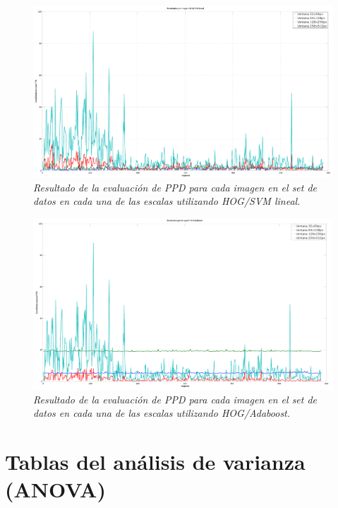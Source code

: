 \begin{figure}[htc]
  \centering
  \includegraphics[scale=.25]{images/fullresultssvm}
  \caption{\em  Resultado de la evaluación de PPD para cada imagen en el set de datos en cada una de las escalas utilizando HOG/SVM lineal.}  
  \label{fig:gcsvm}
\end{figure}

\begin{figure}[htc]
  \centering
  \includegraphics[scale=.25]{images/fullresultsboost}
  \caption{\em  Resultado de la evaluación de PPD para cada imagen en el set de datos en cada una de las escalas utilizando HOG/Adaboost.}  
  \label{fig:gcboost}
\end{figure}


\section{Tablas del análisis de varianza (ANOVA)}

